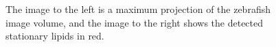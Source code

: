 \documentclass[10pt, a4paper]{article}
\begin{document}
\begin{enumerate}
\begin{figure}[!htbp]
\centering
{}
\caption{\label{fig:hamid}
The image to the left is a maximum projection of the zebrafish image volume, and the image to the right shows the detected stationary lipids in red.}
\end{figure}



\end{enumerate}
\end{document}
